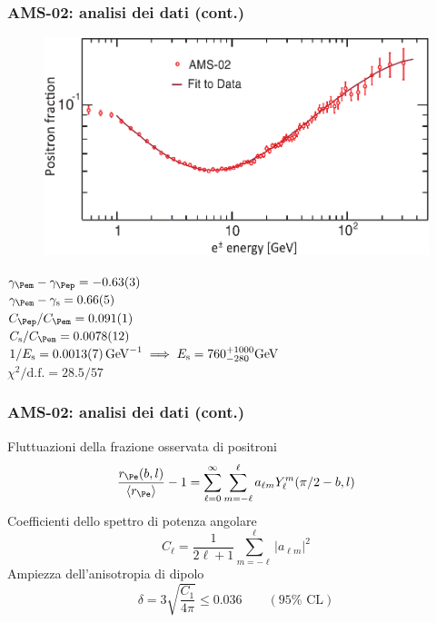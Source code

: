 \documentclass[10pt]{beamer}
\begin{document}
\begin{frame}
  \frametitle{AMS-02: analisi dei dati (cont.)}
  \begin{figure}
    \centering
    \includegraphics[width=.7\columnwidth]{ams2}
  \end{figure}
  $\gamma_{\Pem} - \gamma_{\Pep} = \num{-0.63(3)}$ \\
  $\gamma_{\Pem} - \gamma_{\textup{s}} = \num{0.66(5)}$ \\
  $C_{\Pep}/C_{\Pem} = \num{0.091(1)}$ \\
  $C_{\textup{s}}/C_{\Pem} = \num{0.0078(12)}$ \\
  $1/E_{\textup{s}} =
  \SI[per-mode=reciprocal]{0.0013(7)}{\per\giga\electronvolt} \implies
  E_{\textup{s}} = 760^{+1000}_{-280} \si{\giga \electronvolt}$ \\
  $\chi^{2}/\text{d.f.} = 28.5/57$
\end{frame}

\begin{frame}
  \frametitle{AMS-02: analisi dei dati (cont.)}
  Fluttuazioni della frazione osservata di positroni
  \begin{equation*}
    \frac{r_{\Pe}(b,l)}{\langle r_{\Pe}\rangle} - 1 = \sum_{\ell=0}^{\infty}
    \sum_{m=-\ell}^{\ell} a_{\ell m}Y_{\ell}^{m}(\pi/2 - b,l)
  \end{equation*}
  Coefficienti dello spettro di potenza angolare
  \begin{equation*}
    C_{\ell} = \frac{1}{2\ell + 1} \sum_{m=-\ell}^{\ell} \lvert a_{\ell m}
    \rvert^{2}
  \end{equation*}
  Ampiezza dell'anisotropia di dipolo
  \begin{equation*}
    \delta = 3 \sqrt{\frac{C_{1}}{4\pi}} \leq 0.036 \qquad (95\% \text{ CL})
  \end{equation*}
\end{frame}
\end{document}
